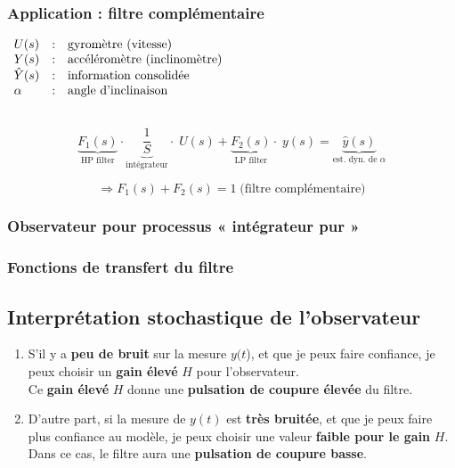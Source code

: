\documentclass[document.tex]{subfiles}
\begin{document}
\subsubsection{Application : filtre complémentaire}

$
\begin{array}{l c l}
U(s) & : & \text{gyromètre (vitesse)} \\
Y(s) & : & \text{accéléromètre (inclinomètre)}\\
\hat{Y}(s) & : & \text{information consolidée} \\
\alpha & : & \text{angle d'inclinaison}\\[12pt]
\end{array}
$

$$\boxed{
\underbrace{F_1(s)}_{\text{HP filter}} \cdot \underbrace{\frac{1}{S}}_{\text{intégrateur}} \cdot \; U(s) + \underbrace{F_2(s)}_{\text{LP filter}} \cdot \; y(s) = \underbrace{\hat{y}(s)}_{\text{est. dyn. de }\alpha}
}$$

$$ \Rightarrow \boxed{F_1(s)} + \boxed{F_2(s)} = 1 \; \text{(filtre complémentaire)} $$

\subsubsection{Observateur pour processus « intégrateur pur »}


\subsubsection{Fonctions de transfert du filtre}


\subsection{Interprétation stochastique de l'observateur}

\begin{enumerate}
\item S'il y a \textbf{peu de bruit} sur la mesure $y(t$), et que je peux faire confiance, je peux choisir un \textbf{gain élevé} \underline{$H$} pour l'observateur.\\
Ce \textbf{gain élevé} \underline{$H$} donne une \textbf{pulsation de coupure élevée} du filtre.
\item D'autre part, si la mesure de $y(t)$ est \textbf{très bruitée}, et que je peux faire plus confiance au modèle, je peux choisir une valeur \textbf{faible pour le gain} \underline{$H$}.\\
Dans ce cas, le filtre aura une \textbf{pulsation de coupure basse}.
\end{enumerate}
\end{document}
